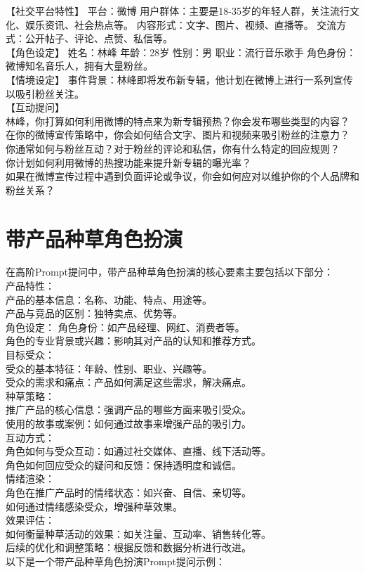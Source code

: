 \documentclass[12pt]{book}
\begin{document}
【社交平台特性】 平台：微博 用户群体：主要是18-35岁的年轻人群，关注流行文化、娱乐资讯、社会热点等。 内容形式：文字、图片、视频、直播等。 交流方式：公开帖子、评论、点赞、私信等。\\

【角色设定】 姓名：林峰 年龄：28岁 性别：男 职业：流行音乐歌手 角色身份：微博知名音乐人，拥有大量粉丝。\\

【情境设定】 事件背景：林峰即将发布新专辑，他计划在微博上进行一系列宣传以吸引粉丝关注。\\

【互动提问】\\

林峰，你打算如何利用微博的特点来为新专辑预热？你会发布哪些类型的内容？\\
在你的微博宣传策略中，你会如何结合文字、图片和视频来吸引粉丝的注意力？\\
你通常如何与粉丝互动？对于粉丝的评论和私信，你有什么特定的回应规则？\\
你计划如何利用微博的热搜功能来提升新专辑的曝光率？\\
如果在微博宣传过程中遇到负面评论或争议，你会如何应对以维护你的个人品牌和粉丝关系？\\

\section{带产品种草角色扮演}
在高阶Prompt提问中，带产品种草角色扮演的核心要素主要包括以下部分：\\

产品特性：\\
产品的基本信息：名称、功能、特点、用途等。\\
产品与竞品的区别：独特卖点、优势等。\\
角色设定：
角色身份：如产品经理、网红、消费者等。\\
角色的专业背景或兴趣：影响其对产品的认知和推荐方式。\\
目标受众：\\
受众的基本特征：年龄、性别、职业、兴趣等。\\
受众的需求和痛点：产品如何满足这些需求，解决痛点。\\
种草策略：\\
推广产品的核心信息：强调产品的哪些方面来吸引受众。\\
使用的故事或案例：如何通过故事来增强产品的吸引力。\\
互动方式：\\
角色如何与受众互动：如通过社交媒体、直播、线下活动等。\\
角色如何回应受众的疑问和反馈：保持透明度和诚信。\\
情绪渲染：\\
角色在推广产品时的情绪状态：如兴奋、自信、亲切等。\\
如何通过情绪感染受众，增强种草效果。\\
效果评估：\\
如何衡量种草活动的效果：如关注量、互动率、销售转化等。\\
后续的优化和调整策略：根据反馈和数据分析进行改进。\\
以下是一个带产品种草角色扮演Prompt提问示例：\\
\end{document}
